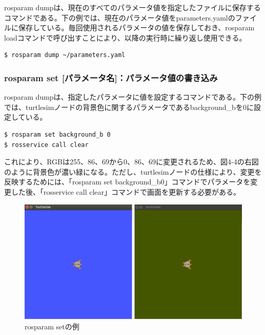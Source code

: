 rosparam dumpは、現在のすべてのパラメータ値を指定したファイルに保存するコマンドである。下の例では、現在のパラメータ値をparameters.yamlのファイルに保存している。毎回使用されるパラメータの値を保存しておき、rosparam loadコマンドで呼び出すことにより、以降の実行時に繰り返し使用できる。

\begin{lstlisting}[language=ROS]
$ rosparam dump ~/parameters.yaml
\end{lstlisting}

\subsubsection{rosparam set [パラメータ名]：パラメータ値の書き込み}

rosparam dumpは、指定したパラメータに値を設定するコマンドである。下の例では、turtlesimノードの背景色に関するパラメータであるbackground\_bを0に設定している。

\begin{lstlisting}[language=ROS]
$ rosparam set background_b 0
$ rosservice call clear
\end{lstlisting}

これにより、RGBは255、86、69から0、86、69に変更されるため、図4-4の右図のように背景色が濃い緑になる。ただし、turtlesimノードの仕様により、変更を反映するためには、「rosparam set background\_b0」コマンドでパラメータを変更した後、「rosservice call clear」コマンドで画面を更新する必要がある。

\begin{figure}[htp]
  \centering
  \includegraphics[width=\columnwidth]{pictures/chapter4/pic_04_04.png}
  \caption{rosparam setの例}
\end{figure}

